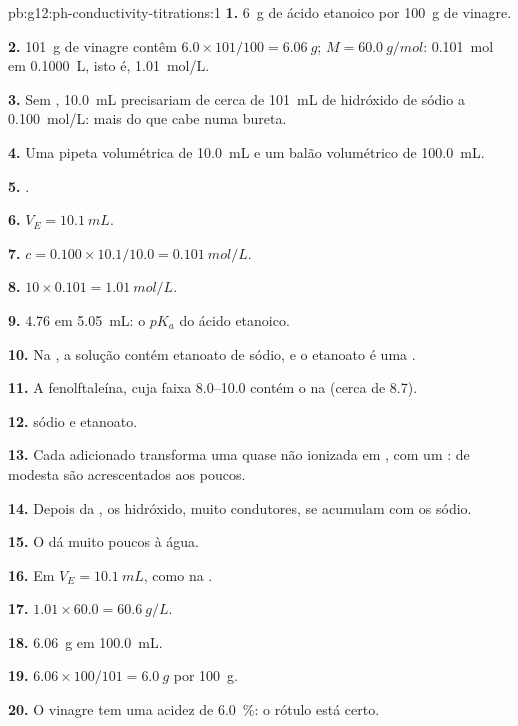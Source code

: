 \begin{solution}{pb:g12:ph-conductivity-titrations:1}
\textbf{1.} \qty{6}{g} de ácido etanoico por \qty{100}{g} de vinagre.

\textbf{2.} \qty{101}{g} de vinagre contêm $6.0 \times 101/100 =
\qty{6.06}{g}$; $M = \qty{60.0}{g/mol}$: \qty{0.101}{mol} em
\qty{0.1000}{L}, isto é, \qty{1.01}{mol/L}.

\textbf{3.} Sem , \qty{10.0}{mL} precisariam de cerca de
\qty{101}{mL} de hidróxido de sódio a \qty{0.100}{mol/L}: mais do que
cabe numa bureta.

\textbf{4.} Uma pipeta volumétrica de \qty{10.0}{mL} e um balão
volumétrico de \qty{100.0}{mL}.

\textbf{5.} .

\textbf{6.} $V_E = \qty{10.1}{mL}$.

\textbf{7.} $c = 0.100 \times 10.1 / 10.0 = \qty{0.101}{mol/L}$.

\textbf{8.} $10 \times 0.101 = \qty{1.01}{mol/L}$.

\textbf{9.}  4.76 em \qty{5.05}{mL}: o $pK_a$ do ácido etanoico.

\textbf{10.} Na , a solução contém etanoato de sódio, e o
etanoato é uma .

\textbf{11.} A fenolftaleína, cuja faixa 8.0--10.0 contém o  na
 (cerca de 8.7).

\textbf{12.}  sódio e  etanoato.

\textbf{13.} Cada  adicionado transforma uma  quase não
ionizada em , com um :  de  modesta
são acrescentados aos poucos.

\textbf{14.} Depois da , os  hidróxido, muito
condutores, se acumulam com os  sódio.

\textbf{15.} O  dá muito poucos  à água.

\textbf{16.} Em $V_E = \qty{10.1}{mL}$, como na .

\textbf{17.} $1.01 \times 60.0 = \qty{60.6}{g/L}$.

\textbf{18.} \qty{6.06}{g} em \qty{100.0}{mL}.

\textbf{19.} $6.06 \times 100 / 101 = \qty{6.0}{g}$ por \qty{100}{g}.

\textbf{20.} O vinagre tem uma acidez de \qty{6.0}{\percent}: o rótulo está certo.
\end{solution}
